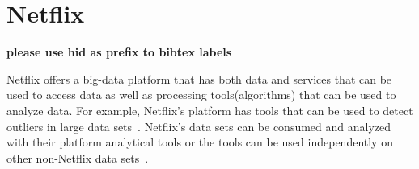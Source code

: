 \section{Netflix}

{\bf please use  hid as prefix to bibtex labels}

Netflix offers a big-data platform that has both data and services that can be
used to access data as well as processing tools(algorithms) that can be used
to analyze data.  For example, Netflix's platform has tools that can be used to
detect outliers in large data sets~\cite{Wong2015}.  Netflix’s data sets can be
consumed and analyzed with their platform analytical tools or the tools can be
used independently on other non-Netflix data sets~\cite{Netflix2018}.

